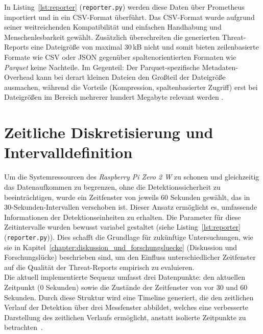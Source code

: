     In Listing~\ref{lst:reporter} (\texttt{reporter.py}) werden diese Daten über Prometheus importiert und in ein CSV-Format überführt. Das CSV-Format wurde aufgrund seiner weitreichenden Kompatibilität und einfachen Handhabung und Menschenlesbarkeit gewählt. Zusätzlich überschreiten die generierten Threat-Reports eine Dateigröße von maximal 30\,kB nicht und somit bieten zeilenbasierte Formate wie CSV oder JSON gegenüber spaltenorientierten Formaten wie \textit{Parquet} keine Nachteile. Im Gegenteil: Der Parquet-spezifische Metadaten-Overhead kann bei derart kleinen Dateien den Großteil der Dateigröße ausmachen, während die Vorteile (Kompression, spaltenbasierter Zugriff) erst bei Dateigrößen im Bereich mehrerer hundert Megabyte relevant werden \cite{taylordavies2023parquet,celerdata2024parquet}.

    \section{Zeitliche Diskretisierung und Intervalldefinition}

    Um die Systemressourcen des \textit{Raspberry Pi Zero 2 W} zu schonen und gleichzeitig das Datenaufkommen zu begrenzen, ohne die Detektionssicherheit zu beeinträchtigen, wurde ein Zeitfenster von jeweils 60 Sekunden gewählt, das in 30-Sekunden-Intervallen verschoben ist. Dieser Ansatz ermöglicht es, umfassende Informationen der Detektionseinheiten zu erhalten. Die Parameter für diese Zeitintervalle wurden bewusst variabel gestaltet (siehe Listing~\ref{lst:reporter} (\texttt{reporter.py})). Dies schafft die Grundlage für zukünftige Untersuchungen, wie sie in Kapitel~\ref{chapter:diskussion_und_forschungsluecke} (Diskussion und Forschungslücke) beschrieben sind, um den Einfluss unterschiedlicher Zeitfenster auf die Qualität der Threat-Reports empirisch zu evaluieren.\\
    Die aktuell implementierte Sequenz umfasst drei Datenpunkte: den aktuellen Zeitpunkt (0 Sekunden) sowie die Zustände der Zeitfenster von vor 30 und 60 Sekunden. Durch diese Struktur wird eine Timeline generiert, die den zeitlichen Verlauf der Detektion über drei Messfenster abbildet, welches eine verbesserte Darstellung des zeitlichen Verlaufs ermöglicht, anstatt isolierte Zeitpunkte zu betrachten~\cite{zhang2019iacf, heigl2021exploiting}.

